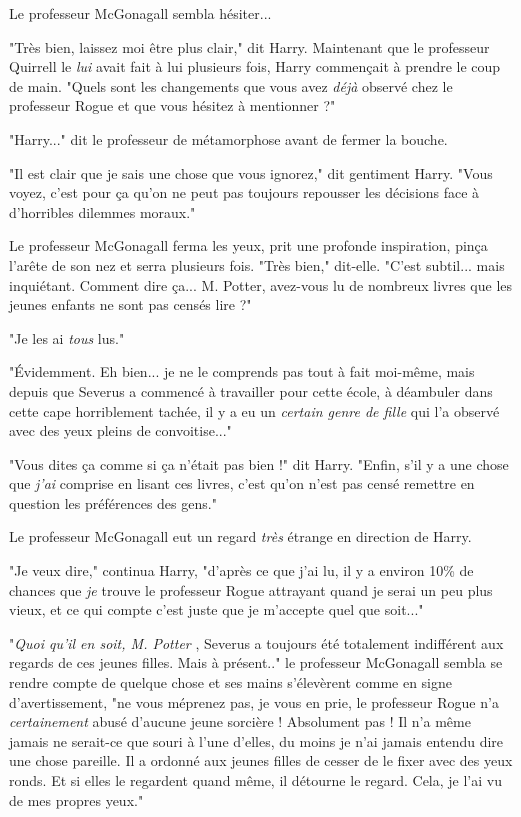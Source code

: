 Le professeur McGonagall sembla hésiter...

"Très bien, laissez moi être plus clair," dit Harry. Maintenant que le professeur Quirrell le \emph{lui}  avait fait à lui plusieurs fois, Harry commençait à prendre le coup de main. "Quels sont les changements que vous avez \emph{déjà}  observé chez le professeur Rogue et que vous hésitez à mentionner ?"

"Harry..." dit le professeur de métamorphose avant de fermer la bouche.

"Il est clair que je sais une chose que vous ignorez," dit gentiment Harry. "Vous voyez, c'est pour ça qu'on ne peut pas toujours repousser les décisions face à d'horribles dilemmes moraux."

Le professeur McGonagall ferma les yeux, prit une profonde inspiration, pinça l'arête de son nez et serra plusieurs fois. "Très bien," dit-elle. "C'est subtil... mais inquiétant. Comment dire ça... M. Potter, avez-vous lu de nombreux livres que les jeunes enfants ne sont pas censés lire ?"

"Je les ai \emph{tous } lus."

"Évidemment. Eh bien... je ne le comprends pas tout à fait moi-même, mais depuis que Severus a commencé à travailler pour cette école, à déambuler dans cette cape horriblement tachée, il y a eu un \emph{certain genre de fille}  qui l'a observé avec des yeux pleins de convoitise..."

"Vous dites ça comme si ça n'était pas bien !" dit Harry. "Enfin, s'il y a une chose que \emph{j'ai } comprise en lisant ces livres, c'est qu'on n'est pas censé remettre en question les préférences des gens."

Le professeur McGonagall eut un regard \emph{très}  étrange en direction de Harry.

"Je veux dire," continua Harry, "d'après ce que j'ai lu, il y a environ 10\% de chances que \emph{je } trouve le professeur Rogue attrayant quand je serai un peu plus vieux, et ce qui compte c'est juste que je m'accepte quel que soit..."

"\emph{Quoi qu'il en soit, M. Potter} , Severus a toujours été totalement indifférent aux regards de ces jeunes filles. Mais à présent.." le professeur McGonagall sembla se rendre compte de quelque chose et ses mains s'élevèrent comme en signe d'avertissement, "ne vous méprenez pas, je vous en prie, le professeur Rogue n'a \emph{certainement}  abusé d'aucune jeune sorcière ! Absolument pas ! Il n'a même jamais ne serait-ce que souri à l'une d'elles, du moins je n'ai jamais entendu dire une chose pareille. Il a ordonné aux jeunes filles de cesser de le fixer avec des yeux ronds. Et si elles le regardent quand même, il détourne le regard. Cela, je l'ai vu de mes propres yeux."


